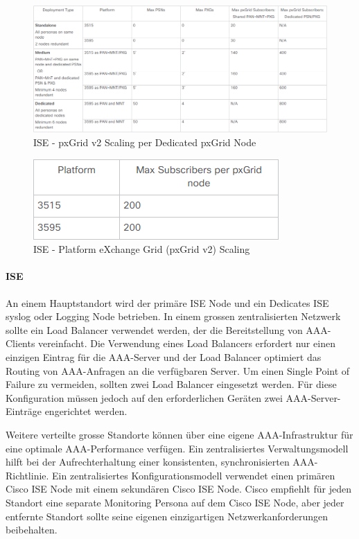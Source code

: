 \begin{figure}[H]
	\centering
	\includegraphics[width=1\linewidth]{img/Absicherung/ISE-PlatformpxGridV2Scaling}
	\caption{ISE - pxGrid v2 Scaling per Dedicated pxGrid Node \cite{ise-scale}}
	\label{fig:ISE - pxGrid v2 Scaling per Dedicated pxGrid Node}
\end{figure}

\begin{figure}[H]
	\centering
	\includegraphics[width=0.5\linewidth]{img/Absicherung/ISE-pxGridV2}
	\caption{ISE - Platform eXchange Grid (pxGrid v2) Scaling \cite{ise-scale}}
	\label{fig:ISE - Platform eXchange Grid (pxGrid v2) Scaling}
\end{figure}


\paragraph{ISE}
An einem Hauptstandort wird der primäre ISE Node und ein Dedicates ISE syslog oder Logging Node betrieben. In einem grossen zentralisierten Netzwerk sollte ein Load Balancer verwendet werden, der die Bereitstellung von AAA-Clients vereinfacht. Die Verwendung eines Load Balancers erfordert nur einen einzigen Eintrag für die AAA-Server und der Load Balancer optimiert das Routing von AAA-Anfragen an die verfügbaren Server. Um einen Single Point of Failure zu vermeiden, sollten zwei Load Balancer eingesetzt werden. Für diese Konfiguration müssen jedoch auf den erforderlichen Geräten zwei AAA-Server-Einträge engerichtet werden.

Weitere verteilte grosse Standorte können über eine eigene AAA-Infrastruktur für eine optimale AAA-Performance verfügen. Ein zentralisiertes Verwaltungsmodell hilft bei der Aufrechterhaltung einer konsistenten, synchronisierten AAA-Richtlinie. Ein zentralisiertes Konfigurationsmodell verwendet einen primären Cisco ISE Node mit einem sekundären Cisco ISE Node. Cisco empfiehlt für jeden Standort eine separate Monitoring Persona auf dem Cisco ISE Node, aber jeder entfernte Standort sollte seine eigenen einzigartigen Netzwerkanforderungen beibehalten.


